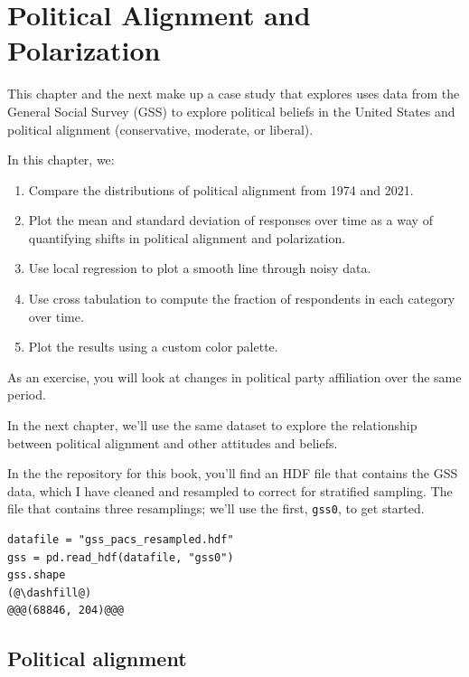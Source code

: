 \hypertarget{political-alignment-and-polarization}{%
\chapter{Political Alignment and
Polarization}\label{political-alignment-and-polarization}}

This chapter and the next make up a case study that explores uses data
from the General Social Survey (GSS) to explore political beliefs in the
United States and political alignment (conservative, moderate, or
liberal).

In this chapter, we:

\begin{enumerate}
\def\labelenumi{\arabic{enumi}.}
\item
  Compare the distributions of political alignment from 1974 and 2021.
\item
  Plot the mean and standard deviation of responses over time as a way
  of quantifying shifts in political alignment and polarization.
\item
  Use local regression to plot a smooth line through noisy data.
\item
  Use cross tabulation to compute the fraction of respondents in each
  category over time.
\item
  Plot the results using a custom color palette.
\end{enumerate}

As an exercise, you will look at changes in political party affiliation
over the same period.

In the next chapter, we'll use the same dataset to explore the
relationship between political alignment and other attitudes and
beliefs.

In the the repository for this book, you'll find an HDF file that
contains the GSS data, which I have cleaned and resampled to correct for
stratified sampling. The file that contains three resamplings; we'll use
the first, \passthrough{\lstinline!gss0!}, to get started.

\begin{lstlisting}[]
datafile = "gss_pacs_resampled.hdf"
gss = pd.read_hdf(datafile, "gss0")
gss.shape
(@\dashfill@)
@@@(68846, 204)@@@
\end{lstlisting}

\hypertarget{political-alignment}{%
\section{Political alignment}\label{political-alignment}}

